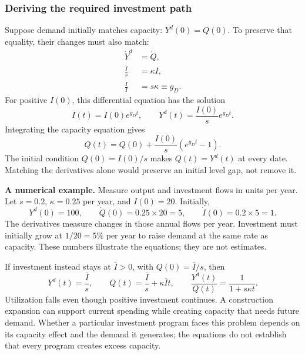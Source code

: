 \subsubsection{Deriving the required investment path}

Suppose demand initially matches capacity: $Y^d(0)=Q(0)$. To preserve that
equality, their changes must also match:
\begin{align}
\dot Y^d&=\dot Q,\\
\frac{\dot I}{s}&=\kappa I,\\
\frac{\dot I}{I}&=s\kappa\equiv g_D.\label{eq:domar-required-growth}
\end{align}
For positive $I(0)$, this differential equation has the solution
\begin{equation}
I(t)=I(0)e^{g_Dt},\qquad Y^d(t)=\frac{I(0)}{s}e^{g_Dt}.
\end{equation}
Integrating the capacity equation gives
\begin{equation}
Q(t)=Q(0)+\frac{I(0)}{s}\left(e^{g_Dt}-1\right).
\end{equation}
The initial condition $Q(0)=I(0)/s$ makes $Q(t)=Y^d(t)$ at every date. Matching
the derivatives alone would preserve an initial level gap, not remove it.

\begin{blueblock}
\textbf{A numerical example.}
Measure output and investment flows in units per year. Let $s=0.2$,
$\kappa=0.25$ per year, and $I(0)=20$. Initially,
\[
Y^d(0)=100,\qquad \dot Q(0)=0.25\times20=5,\qquad
\dot I(0)=0.2\times5=1.
\]
The derivatives measure changes in those annual flows per year. Investment
must initially grow at $1/20=5\%$ per year to raise demand at the same rate
as capacity. These numbers illustrate the equations; they are not estimates.
\end{blueblock}

If investment instead stays at $\bar I>0$, with $Q(0)=\bar I/s$, then
\begin{equation}
Y^d(t)=\frac{\bar I}{s},\qquad
Q(t)=\frac{\bar I}{s}+\kappa\bar I t,\qquad
\frac{Y^d(t)}{Q(t)}=\frac{1}{1+s\kappa t}.
\end{equation}
Utilization falls even though positive investment continues. A construction
expansion can support current spending while creating capacity that needs
future demand. Whether a particular investment program faces this problem
depends on its capacity effect and the demand it generates; the equations do
not establish that every program creates excess capacity.

